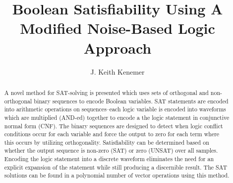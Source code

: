 \documentclass[reqno]{amsart}
\theoremstyle{definition}
\theoremstyle{remark}
\begin{document}

\title{Boolean Satisfiability Using A Modified Noise-Based Logic Approach }

\author{J. Keith Kenemer}






\begin{abstract}
A novel method for SAT-solving is presented which uses sets of orthogonal and non-orthogonal binary sequences to encode Boolean variables. SAT statements are encoded into arithmetic operations on sequences--each logic variable is encoded into waveforms which are multiplied (AND-ed) together to encode a the logic statement in conjunctive normal form (CNF).  The binary sequences are designed to detect when logic conflict conditions occur for each variable and force the output to zero for each term where this occurs by utilizing orthogonality. Satisfiability can be determined based on whether the output sequence is non-zero (SAT) or zero (UNSAT) over all samples. Encoding the logic statement into a discrete waveform eliminates the need for an explicit expansion of the statement while still producing a discernible result. The SAT solutions can be found in a polynomial number of vector operations using this method.

\end{abstract}

\end{document}
